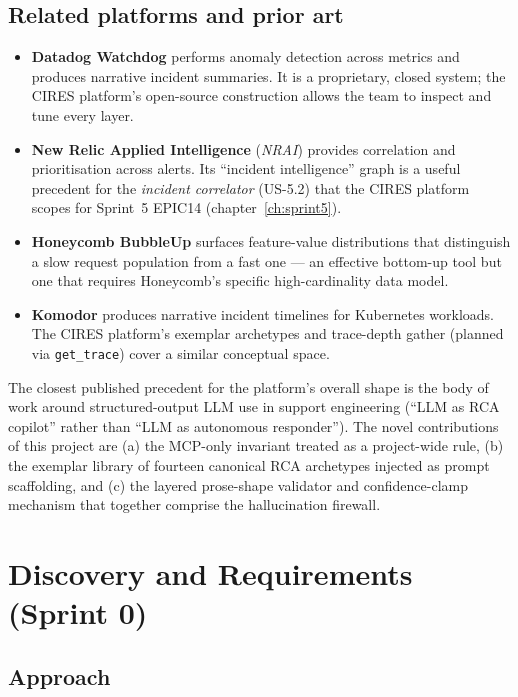 \documentclass[11pt,a4paper,oneside]{report}
\begin{document}
\section{Related platforms and prior art}

\begin{itemize}
  \item \textbf{Datadog Watchdog} performs anomaly detection across
        metrics and produces narrative incident summaries.  It is a
        proprietary, closed system; the CIRES platform's open-source
        construction allows the team to inspect and tune every layer.
  \item \textbf{New Relic Applied Intelligence} (\emph{NRAI}) provides
        correlation and prioritisation across alerts.  Its
        ``incident intelligence'' graph is a useful precedent for the
        \emph{incident correlator} (US-5.2) that the CIRES platform
        scopes for Sprint~5 EPIC14 (chapter~\ref{ch:sprint5}).
  \item \textbf{Honeycomb BubbleUp} surfaces feature-value
        distributions that distinguish a slow request population from a
        fast one --- an effective bottom-up tool but one that requires
        Honeycomb's specific high-cardinality data model.
  \item \textbf{Komodor} produces narrative incident timelines for
        Kubernetes workloads.  The CIRES platform's exemplar archetypes
        and trace-depth gather (planned via \texttt{get\_trace}) cover
        a similar conceptual space.
\end{itemize}

The closest published precedent for the platform's overall shape is
the body of work around structured-output LLM use in support engineering
(``LLM as RCA copilot'' rather than ``LLM as autonomous responder'').
The novel contributions of this project are (a) the MCP-only invariant
treated as a project-wide rule, (b) the exemplar library of fourteen
canonical RCA archetypes injected as prompt scaffolding, and (c) the
layered prose-shape validator and confidence-clamp mechanism that
together comprise the hallucination firewall.

\chapter{Discovery and Requirements (Sprint 0)}
\label{ch:discovery}

\section{Approach}
\end{document}
